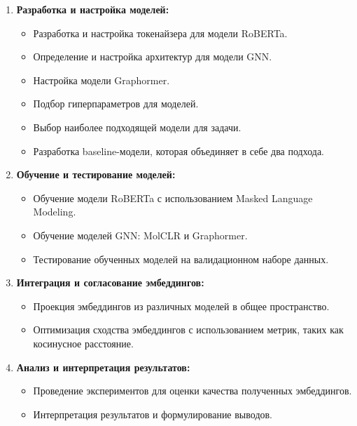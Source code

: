 \begin{enumerate}
\item \textbf{Разработка и настройка моделей:}
\begin{itemize}
    \item Разработка и настройка токенайзера для модели RoBERTa.
    \item Определение и настройка архитектур для модели GNN.
    \item Настройка модели Graphormer.
    \item Подбор гиперпараметров для моделей.
    \item Выбор наиболее подходящей модели для задачи.
    \item Разработка baseline-модели, которая объединяет в себе два подхода.
\end{itemize}

\item \textbf{Обучение и тестирование моделей:}
\begin{itemize}
    \item Обучение модели RoBERTa с использованием Masked Language Modeling.
    \item Обучение моделей GNN: MolCLR и Graphormer.
    \item Тестирование обученных моделей на валидационном наборе данных.
\end{itemize}

\item \textbf{Интеграция и согласование эмбеддингов:}
\begin{itemize}
    \item Проекция эмбеддингов из различных моделей в общее пространство.
    \item Оптимизация сходства эмбеддингов с использованием метрик, таких как косинусное расстояние.
\end{itemize}

\item \textbf{Анализ и интерпретация результатов:}
\begin{itemize}
    \item Проведение экспериментов для оценки качества полученных эмбеддингов.
    \item Интерпретация результатов и формулирование выводов.
\end{itemize}

\end{enumerate}

\newpage
